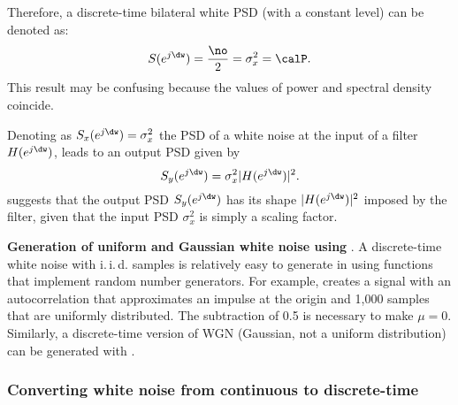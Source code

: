 Therefore, a discrete-time bilateral white PSD (with a constant level) can be denoted as:
\begin{equation}
S(e^{j \dw}) = \frac{\no}{2} = \sigma_x^2 = \calP.
\label{eq:whiteNoisePSD}
\end{equation}
This result may be confusing because the values of power and spectral density coincide.

Denoting as $S_x(e^{j \dw}) = \sigma_x^2$ the PSD of a white noise at the input of a filter $H(e^{j \dw})$, 
 leads to an output PSD given by
\begin{equation}
S_y(e^{j \dw}) = \sigma_x^2 |H(e^{j \dw})|^2.
\label{eq:discrete_filtered_awgn}
\end{equation}
 suggests that the output PSD $S_y(e^{j \dw})$ has its shape $|H(e^{j \dw})|^2$ imposed by the filter, given that the input PSD $\sigma_x^2$ is simply a scaling factor.


\bExample \textbf{Generation of uniform and Gaussian white noise using {\matlab}}.
A discrete-time white noise with i.\,i.\,d. samples is relatively easy to generate in {\matlab} using functions that implement random number generators. For example,  creates a signal with an autocorrelation that approximates an impulse at the origin and 1,000 samples that are uniformly distributed. The subtraction of 0.5 is necessary to make $\mu = 0$. Similarly, a discrete-time version of WGN (Gaussian, not a uniform distribution) can be generated with . 
\eExample

\subsubsection{Converting white noise from continuous to discrete-time}

